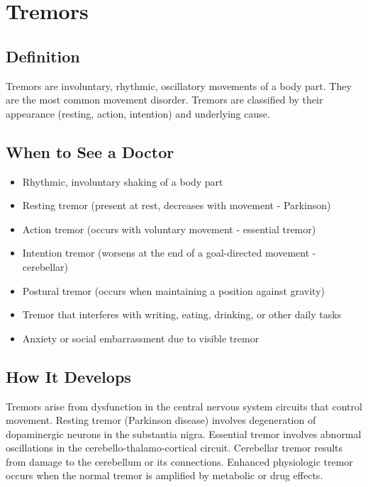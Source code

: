 \chapter{Tremors}

\section*{Definition}
Tremors are involuntary, rhythmic, oscillatory movements of a body part. They are the most common movement disorder. Tremors are classified by their appearance (resting, action, intention) and underlying cause.

\section*{When to See a Doctor}
\begin{itemize}
\item Rhythmic, involuntary shaking of a body part
\item Resting tremor (present at rest, decreases with movement - Parkinson)
\item Action tremor (occurs with voluntary movement - essential tremor)
\item Intention tremor (worsens at the end of a goal-directed movement - cerebellar)
\item Postural tremor (occurs when maintaining a position against gravity)
\item Tremor that interferes with writing, eating, drinking, or other daily tasks
\item Anxiety or social embarrassment due to visible tremor
\end{itemize}

\section*{How It Develops}
Tremors arise from dysfunction in the central nervous system circuits that control movement. Resting tremor (Parkinson disease) involves degeneration of dopaminergic neurons in the substantia nigra. Essential tremor involves abnormal oscillations in the cerebello-thalamo-cortical circuit. Cerebellar tremor results from damage to the cerebellum or its connections. Enhanced physiologic tremor occurs when the normal tremor is amplified by metabolic or drug effects.

